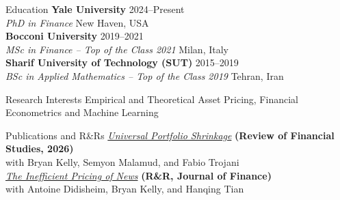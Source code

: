 \documentclass{resume}
\begin{document}
\begin{rSection}{Education}
{\bf Yale University} \hfill {2024–Present} \\
{\it PhD in Finance} \hfill {New Haven, USA} \\[-0.9em]

{\bf Bocconi University} \hfill {2019–2021} \\
{\it MSc in Finance – Top of the Class 2021} \hfill {Milan, Italy} \\[-0.9em]

{\bf Sharif University of Technology (SUT)} \hfill {2015–2019} \\
{\it BSc in Applied Mathematics – Top of the Class 2019} \hfill {Tehran, Iran}
\end{rSection}

\begin{rSection}{Research Interests}
Empirical and Theoretical Asset Pricing, Financial Econometrics and Machine Learning 
\end{rSection}

\begin{rSection}{Publications and R\&Rs}
\href{https://doi.org/10.1093/rfs/hhag084}{\textit{Universal Portfolio Shrinkage}} \textbf{(Review of Financial Studies, 2026)} \\
with Bryan Kelly, Semyon Malamud, and Fabio Trojani \\ [-0.9em]

\href{https://papers.ssrn.com/sol3/papers.cfm?abstract_id=6540399}{\textit{The Inefficient Pricing of News}} \textbf{(R\&R, Journal of Finance)} \\
with Antoine Didisheim, Bryan Kelly, and Hanqing Tian \\ [-0.9em]
\end{rSection}
\end{document}
